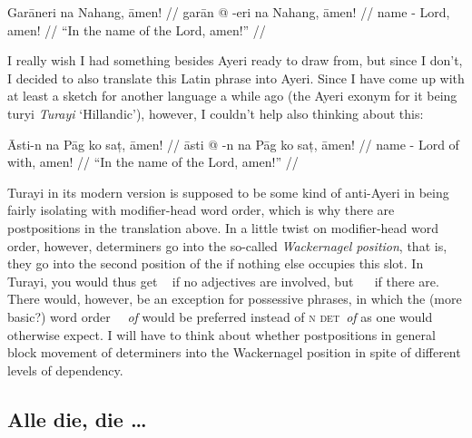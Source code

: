 \documentclass[12pt,paper=a4]{scrartcl}
\newcommand{\fw}[1]{\textit{#1}} %
\newcommand{\xayr}[3]{{\Tagati #1} \emph{#2} \enquote*{#3}}
\begin{document}

\ex \label{ex:innomine}
\begingl
	\glpreamble Garāneri na Nahang, āmen! //
	\gla garān @ -eri na Nahang, āmen! //
	\glb name -\Ins{} \Gen{} Lord, amen! //
	\glft \enquote{In the name of the Lord, amen!} //
\endgl \xe

I really wish I had something besides Ayeri ready to draw from, but 
since I don't, I decided to also translate this Latin phrase into Ayeri.
Since I have come up with at least a sketch for another language a while ago 
(the Ayeri exonym for it being \xayr{turyi}{Turayi}{Hillandic}), however, I 
couldn't help also thinking about this:

\ex[exno=\ref{ex:innomine}′] \begingl
	\glpreamble {} Āsti-n na Pāg 
		ko saț, āmen! //
	\gla āsti @ -n na Pāg ko saț, āmen! //
	\glb name -\Def{} \Def{} Lord of with, amen! //
	\glft \enquote{In the name of the Lord, amen!} //
\endgl
\xe

Turayi in its modern version is supposed to be some kind of anti-Ayeri in being 
fairly isolating with modifier-head word order, which is why there are 
postpositions in the translation above. In a little twist on modifier-head
word order, however, determiners go into the so-called \fw{Wackernagel position}, 
that is, they go into the second position of the \Np{} if nothing else occupies 
this slot. In Turayi, you would thus get \Noun{}~\Det{} if no 
adjectives are involved, but \Adj{}~\Det{}~\Noun{} if there are. 
There would, however, be an exception for possessive phrases, in which the (more 
basic?) word order \Det{}~\Noun{}~\emph{of} would be preferred instead 
of \textsc{n det}~\emph{of} as one would otherwise expect. I will have to think 
about whether postpositions in general block movement of determiners into the 
Wackernagel position in spite of different levels of dependency.

\subsection*{Alle die, die …}

\end{document}
